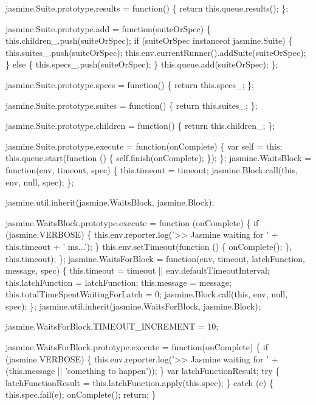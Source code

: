 \begin{DoxyCodeInclude}
jasmine.Suite.prototype.results = \textcolor{keyword}{function}() \{
  \textcolor{keywordflow}{return} this.queue.results();
\};

jasmine.Suite.prototype.add = \textcolor{keyword}{function}(suiteOrSpec) \{
  this.children\_.push(suiteOrSpec);
  \textcolor{keywordflow}{if} (suiteOrSpec instanceof jasmine.Suite) \{
    this.suites\_.push(suiteOrSpec);
    this.env.currentRunner().addSuite(suiteOrSpec);
  \} \textcolor{keywordflow}{else} \{
    this.specs\_.push(suiteOrSpec);
  \}
  this.queue.add(suiteOrSpec);
\};

jasmine.Suite.prototype.specs = \textcolor{keyword}{function}() \{
  \textcolor{keywordflow}{return} this.specs\_;
\};

jasmine.Suite.prototype.suites = \textcolor{keyword}{function}() \{
  \textcolor{keywordflow}{return} this.suites\_;
\};

jasmine.Suite.prototype.children = \textcolor{keyword}{function}() \{
  \textcolor{keywordflow}{return} this.children\_;
\};

jasmine.Suite.prototype.execute = \textcolor{keyword}{function}(onComplete) \{
  var \textcolor{keyword}{self} = \textcolor{keyword}{this};
  this.queue.start(\textcolor{keyword}{function} () \{
    \textcolor{keyword}{self}.finish(onComplete);
  \});
\};
jasmine.WaitsBlock = \textcolor{keyword}{function}(env, timeout, spec) \{
  this.timeout = timeout;
  jasmine.Block.call(\textcolor{keyword}{this}, env, null, spec);
\};

jasmine.util.inherit(jasmine.WaitsBlock, jasmine.Block);

jasmine.WaitsBlock.prototype.execute = \textcolor{keyword}{function} (onComplete) \{
  \textcolor{keywordflow}{if} (jasmine.VERBOSE) \{
    this.env.reporter.log(\textcolor{stringliteral}{'>> Jasmine waiting for '} + this.timeout + \textcolor{stringliteral}{' ms...'});
  \}
  this.env.setTimeout(\textcolor{keyword}{function} () \{
    onComplete();
  \}, this.timeout);
\};
jasmine.WaitsForBlock = \textcolor{keyword}{function}(env, timeout, latchFunction, message, spec) \{
  this.timeout = timeout || env.defaultTimeoutInterval;
  this.latchFunction = latchFunction;
  this.message = message;
  this.totalTimeSpentWaitingForLatch = 0;
  jasmine.Block.call(\textcolor{keyword}{this}, env, null, spec);
\};
jasmine.util.inherit(jasmine.WaitsForBlock, jasmine.Block);

jasmine.WaitsForBlock.TIMEOUT\_INCREMENT = 10;

jasmine.WaitsForBlock.prototype.execute = \textcolor{keyword}{function}(onComplete) \{
  \textcolor{keywordflow}{if} (jasmine.VERBOSE) \{
    this.env.reporter.log(\textcolor{stringliteral}{'>> Jasmine waiting for '} + (this.message || \textcolor{stringliteral}{'something to happen'}));
  \}
  var latchFunctionResult;
  \textcolor{keywordflow}{try} \{
    latchFunctionResult = this.latchFunction.apply(this.spec);
  \} \textcolor{keywordflow}{catch} (e) \{
    this.spec.fail(e);
    onComplete();
    \textcolor{keywordflow}{return};
  \}


\end{DoxyCodeInclude}

